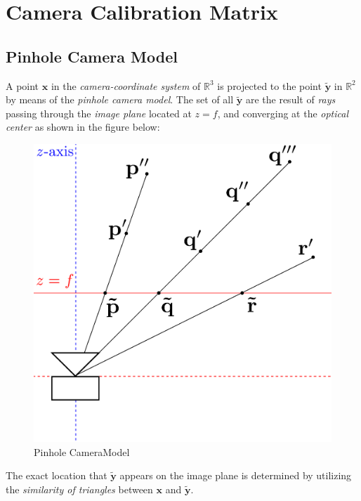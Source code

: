 \section{Camera Calibration Matrix}

\subsection{Pinhole Camera Model}

\par A point $\mathbf{x}$ in the \textit{camera-coordinate system} of $\mathbb{R}^3$ is projected to the point $\mathbf{\tilde{y}}$ in $\mathbb{R}^{2}$ by means of the \textit{pinhole camera model}. The set of all $\mathbf{\tilde{y}}$ are the result of \textit{rays} passing through the \textit{image plane} located at $z=f$, and converging at the \textit{optical center} as shown in the figure below:
\begin{figure}[htbp]
	\centering
%	
	\includegraphics[scale=0.25]{Camera}
	\caption{Pinhole CameraModel}
\end{figure}\newline
The exact location that $\mathbf{\tilde{y}}$ appears on the image plane is determined by utilizing the \textit{similarity of triangles} between $\mathbf{x}$ and $\mathbf{\tilde{y}}$. 
